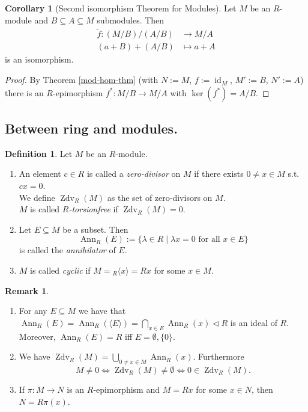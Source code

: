 \documentclass[12pt,a4paper]{report}
\theoremstyle{definition}
\newtheorem{corollary}[theorem]{Corollary} %
\newtheorem{defn}[theorem]{Definition}
\newtheorem*{remark}{Remark}
\theoremstyle{num.custom-title}
\DeclareMathOperator{\id}{id}
\DeclareMathOperator{\Zdv}{Zdv}
\DeclareMathOperator{\Ann}{Ann}
\DeclareMathOperator{\sse}{\subseteq}
\renewcommand{\iff}{\Leftrightarrow}
\begin{document}
\begin{corollary}[Second isomorphism Theorem for Modules]
Let $M$ be an $R$-module and $B \sse A \sse M$ submodules. Then 
\begin{align*}
\tilde{f} \colon (M/B)/(A/B) &\to M/A \\
(a+B)+(A/B) &\mapsto a+A
\end{align*}
is an isomorphism.
\begin{proof}
By Theorem \ref{mod-hom-thm} (with $N:=M$, $f:=\id_M$, $M':=B$, $N':=A$) there is an $R$-epimorphism $f^*: M/B \to M/A$ with $\ker(f^*) = A/B$.
\end{proof}
\end{corollary}

\subsection{Between ring and modules.}

\begin{defn}
Let $M$ be an $R$-module.
\begin{enumerate}
\item An element $c \in R$ is called a \emph{zero-divisor} on $M$ if there exists $0 \neq x \in M$ s.t. $cx=0$.\\
We define $\Zdv_R(M)$ as the set of zero-divisors on $M$.\\
$M$ is called \emph{$R$-torsionfree} if $\Zdv_R(M)=0$.
\item Let $E \sse M$ be a subset. Then
\[
\Ann_R(E) := \{\lambda \in R \mid \lambda x = 0 \text{ for all } x \in E\}
\]
is called the \emph{annihilator} of $E$.
\item $M$ is called \emph{cyclic} if $M={}_R \langle x \rangle = Rx$ for some $x \in M$.
\end{enumerate}
\end{defn}

\begin{remark}\ 
\begin{enumerate}
\item For any $E \sse M$ we have that $\Ann_R(E) = \Ann_R(\langle E \rangle) = \bigcap_{x \in E} \Ann_R(x) \lhd R$ is an ideal of $R$. Moreover, $\Ann_R(E)=R$ iff $E = \emptyset,\{0\}$.
\item We have $\Zdv_R(M) = \bigcup_{0 \neq x \in M} \Ann_R(x)$. Furthermore
\[
M \neq 0 \iff \Zdv_R(M) \neq \emptyset \iff 0 \in \Zdv_R(M).
\]
\item If $\pi \colon M \to N$ is an $R$-epimorphism and $M=Rx$ for some $x \in N$, then $N=R\pi(x)$.
\end{enumerate}
\end{remark}
\end{document}
